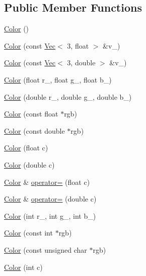 \subsection*{Public Member Functions}
\begin{DoxyCompactItemize}
\item 
\hyperlink{classtrimesh_1_1Color_a5f3b1f0bc94c9d5961b6ec18d7b5680b}{Color} ()
\item 
\hyperlink{classtrimesh_1_1Color_a28065ab275e33f2d15f6e04454b46e62}{Color} (const \hyperlink{classtrimesh_1_1Vec}{Vec}$<$ 3, float $>$ \&v\+\_\+)
\item 
\hyperlink{classtrimesh_1_1Color_a7392a0749cb1dcc68e612cf78e0a3981}{Color} (const \hyperlink{classtrimesh_1_1Vec}{Vec}$<$ 3, double $>$ \&v\+\_\+)
\item 
\hyperlink{classtrimesh_1_1Color_af29b64418e6ca02c58576c93ca0e975f}{Color} (float r\+\_\+, float g\+\_\+, float b\+\_\+)
\item 
\hyperlink{classtrimesh_1_1Color_abc30f1ba7fafda012a34ab9d10674641}{Color} (double r\+\_\+, double g\+\_\+, double b\+\_\+)
\item 
\hyperlink{classtrimesh_1_1Color_a41529c8f161c5e24e0ab1101dc1aa38f}{Color} (const float $\ast$rgb)
\item 
\hyperlink{classtrimesh_1_1Color_a33efbf8310345af27ce0848065d53f3f}{Color} (const double $\ast$rgb)
\item 
\hyperlink{classtrimesh_1_1Color_a9eda4f560e7bb7f874df6d5c6d9c35e2}{Color} (float c)
\item 
\hyperlink{classtrimesh_1_1Color_a5074dcb961dac61df90afc86b66ec7f4}{Color} (double c)
\item 
\hyperlink{classtrimesh_1_1Color}{Color} \& \hyperlink{classtrimesh_1_1Color_a5db3d69c50675fead68e02b92247a410}{operator=} (float c)
\item 
\hyperlink{classtrimesh_1_1Color}{Color} \& \hyperlink{classtrimesh_1_1Color_a3af13e0b2b3b1e778ac35d9063adc3a5}{operator=} (double c)
\item 
\hyperlink{classtrimesh_1_1Color_a7b791c39c2b3a3f71819b46208bfd655}{Color} (int r\+\_\+, int g\+\_\+, int b\+\_\+)
\item 
\hyperlink{classtrimesh_1_1Color_a89ec2caff8d63d6d7be4bf06e2559f94}{Color} (const int $\ast$rgb)
\item 
\hyperlink{classtrimesh_1_1Color_acb4e744c4467b999881b020d9cc5cd9c}{Color} (const unsigned char $\ast$rgb)
\item 
\hyperlink{classtrimesh_1_1Color_ad4c51fc21300fbba703895eb6af9b8d4}{Color} (int c)

\end{DoxyCompactItemize}
